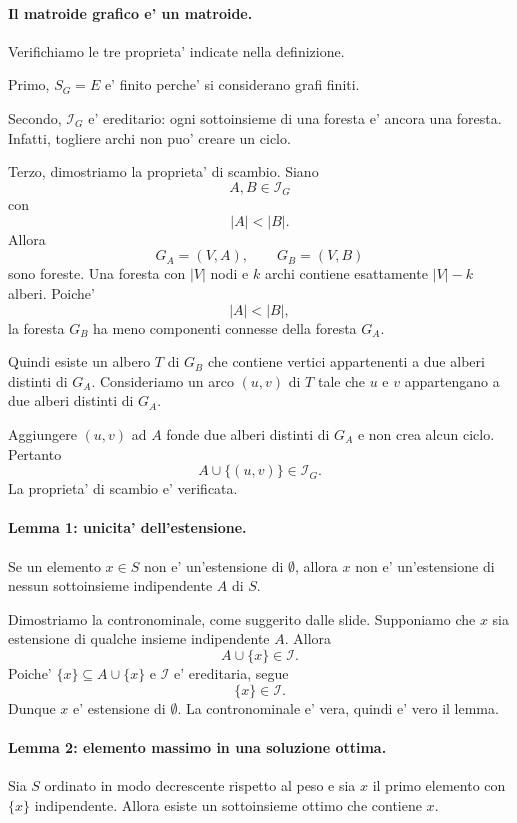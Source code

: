 \paragraph{Il matroide grafico e' un matroide.}
Verifichiamo le tre proprieta' indicate nella definizione.

Primo, $S_G=E$ e' finito perche' si considerano grafi finiti.

Secondo, $\mathcal{I}_G$ e' ereditario: ogni sottoinsieme di una foresta e' ancora una foresta. Infatti, togliere archi non puo' creare un ciclo.

Terzo, dimostriamo la proprieta' di scambio. Siano
\[
A,B\in\mathcal{I}_G
\]
con
\[
|A|<|B|.
\]
Allora
\[
G_A=(V,A),\qquad G_B=(V,B)
\]
sono foreste. Una foresta con $|V|$ nodi e $k$ archi contiene esattamente $|V|-k$ alberi. Poiche'
\[
|A|<|B|,
\]
la foresta $G_B$ ha meno componenti connesse della foresta $G_A$.

Quindi esiste un albero $T$ di $G_B$ che contiene vertici appartenenti a due alberi distinti di $G_A$. Consideriamo un arco $(u,v)$ di $T$ tale che $u$ e $v$ appartengano a due alberi distinti di $G_A$.

Aggiungere $(u,v)$ ad $A$ fonde due alberi distinti di $G_A$ e non crea alcun ciclo. Pertanto
\[
A\cup\{(u,v)\}\in\mathcal{I}_G.
\]
La proprieta' di scambio e' verificata.

\paragraph{Lemma 1: unicita' dell'estensione.}
Se un elemento $x\in S$ non e' un'estensione di $\emptyset$, allora $x$ non e' un'estensione di nessun sottoinsieme indipendente $A$ di $S$.

Dimostriamo la contronominale, come suggerito dalle slide. Supponiamo che $x$ sia estensione di qualche insieme indipendente $A$. Allora
\[
A\cup\{x\}\in\mathcal{I}.
\]
Poiche' $\{x\}\subseteq A\cup\{x\}$ e $\mathcal{I}$ e' ereditaria, segue
\[
\{x\}\in\mathcal{I}.
\]
Dunque $x$ e' estensione di $\emptyset$. La contronominale e' vera, quindi e' vero il lemma.

\paragraph{Lemma 2: elemento massimo in una soluzione ottima.}
Sia $S$ ordinato in modo decrescente rispetto al peso e sia $x$ il primo elemento con $\{x\}$ indipendente. Allora esiste un sottoinsieme ottimo che contiene $x$.

